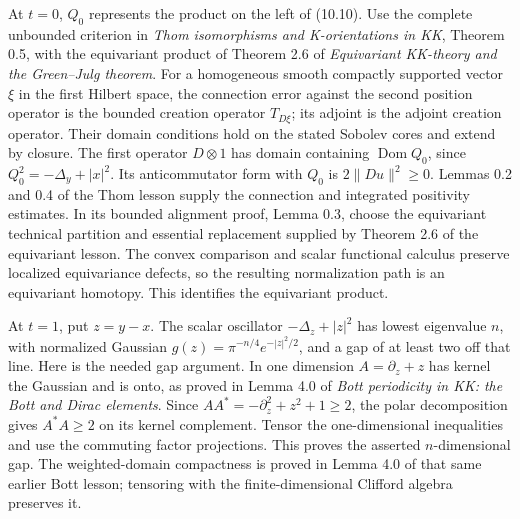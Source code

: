 \documentclass[
  11pt,
]{article}
\begin{document}
At \(t=0\), \(Q_0\) represents the product on the left of (10.10). Use
the complete unbounded criterion in \emph{Thom isomorphisms and
K-orientations in KK}, Theorem 0.5, with the equivariant product of
Theorem 2.6 of \emph{Equivariant KK-theory and the Green--Julg theorem}.
For a homogeneous smooth compactly supported vector \(\xi\) in the first
Hilbert space, the connection error against the second position operator
is the bounded creation operator \(T_{D\xi}\); its adjoint is the
adjoint creation operator. Their domain conditions hold on the stated
Sobolev cores and extend by closure. The first operator \(D\otimes1\)
has domain containing \(\operatorname{Dom}Q_0\), since
\(Q_0^2=-\Delta_y+|x|^2\). Its anticommutator form with \(Q_0\) is
\(2\|D u\|^2\geq0\). Lemmas 0.2 and 0.4 of the Thom lesson supply the
connection and integrated positivity estimates. In its bounded alignment
proof, Lemma 0.3, choose the equivariant technical partition and
essential replacement supplied by Theorem 2.6 of the equivariant lesson.
The convex comparison and scalar functional calculus preserve localized
equivariance defects, so the resulting normalization path is an
equivariant homotopy. This identifies the equivariant product.

At \(t=1\), put \(z=y-x\). The scalar oscillator \(-\Delta_z+|z|^2\) has
lowest eigenvalue \(n\), with normalized Gaussian
\(g(z)=\pi^{-n/4}e^{-|z|^2/2}\), and a gap of at least two off that
line. Here is the needed gap argument. In one dimension
\(A=\partial_z+z\) has kernel the Gaussian and is onto, as proved in
Lemma 4.0 of \emph{Bott periodicity in KK: the Bott and Dirac elements}.
Since \(AA^*=-\partial_z^2+z^2+1\geq2\), the polar decomposition gives
\(A^*A\geq2\) on its kernel complement. Tensor the one-dimensional
inequalities and use the commuting factor projections. This proves the
asserted \(n\)-dimensional gap. The weighted-domain compactness is
proved in Lemma 4.0 of that same earlier Bott lesson; tensoring with the
finite-dimensional Clifford algebra preserves it.
\end{document}
